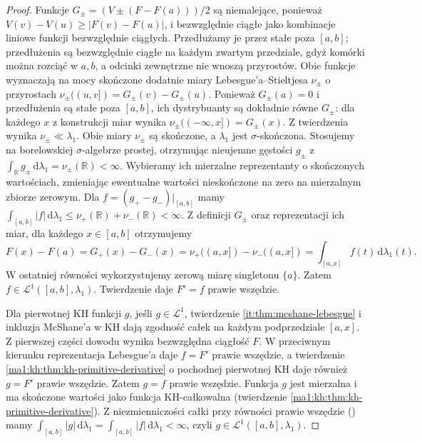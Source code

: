 \begin{proof}
Funkcje $G_\pm=(V\pm(F-F(a)))/2$ są niemalejące, ponieważ $V(v)-V(u)\ge|F(v)-F(u)|$, i bezwzględnie ciągłe jako kombinacje liniowe funkcji bezwzględnie ciągłych. Przedłużamy je przez stałe poza $[a,b]$; przedłużenia są bezwzględnie ciągłe na każdym zwartym przedziale, gdyż komórki można rozciąć w $a,b$, a odcinki zewnętrzne nie wnoszą przyrostów. Obie funkcje wyznaczają na mocy  skończone dodatnie miary Lebesgue'a--Stieltjesa $\nu_\pm$ o przyrostach $\nu_\pm((u,v])=G_\pm(v)-G_\pm(u)$. Ponieważ $G_\pm(a)=0$ i przedłużenia są stałe
poza $[a,b]$, ich dystrybuanty są dokładnie równe
$G_\pm$: dla każdego $x$ z konstrukcji miar wynika
$\nu_\pm((-\infty,x])=G_\pm(x)$.
Z twierdzenia  wynika
$\nu_\pm\ll\lambda_1$. Obie miary $\nu_\pm$ są skończone, a $\lambda_1$
jest $\sigma$-skończona. Stosujemy
na borelowskiej $\sigma$-algebrze prostej, otrzymując
nieujemne gęstości $g_\pm$ z
$\int_{\mathbb R}g_\pm\,\mathrm d\lambda_1=\nu_\pm(\mathbb R)<\infty$.
Wybieramy ich mierzalne reprezentanty o skończonych wartościach,
zmieniając ewentualne wartości nieskończone na zero
na mierzalnym zbiorze zerowym.
Dla $f=(g_+-g_-)|_{[a,b]}$ mamy
$\int_{[a,b]}|f|\,\mathrm d\lambda_1
\le\nu_+(\mathbb R)+\nu_-(\mathbb R)<\infty$.
Z definicji $G_\pm$ oraz reprezentacji ich miar,
dla każdego $x\in[a,b]$ otrzymujemy
\[
 F(x)-F(a)=G_+(x)-G_-(x)
 =\nu_+((a,x])-\nu_-((a,x])
 =\int_{[a,x]}f(t)\,\mathrm d\lambda_1(t).
\]
W ostatniej równości wykorzystujemy zerową miarę
singletonu $\{a\}$. Zatem $f\in\mathcal L^1([a,b],\lambda_1)$. Twierdzenie  daje $F'=f$ prawie wszędzie.

Dla pierwotnej KH funkcji $g$, jeśli $g\in\mathcal L^1$, twierdzenie \ref{it:thm:mcshane-lebesgue} i inkluzja McShane'a w KH dają zgodność całek na każdym podprzedziale $[a,x]$. Z pierwszej części dowodu wynika bezwzględna ciągłość $F$. W przeciwnym kierunku reprezentacja Lebesgue'a daje $f=F'$ prawie wszędzie, a twierdzenie \ref{ma1:kh:thm:kh-primitive-derivative} o pochodnej pierwotnej KH daje również $g=F'$ prawie wszędzie. Zatem $g=f$ prawie wszędzie. Funkcja $g$ jest mierzalna i ma skończone wartości jako funkcja KH-całkowalna (twierdzenie \ref{ma1:kh:thm:kh-primitive-derivative}). Z niezmienniczości całki przy równości prawie wszędzie () mamy $\int_{[a,b]}|g|\,\mathrm d\lambda_1=\int_{[a,b]}|f|\,\mathrm d\lambda_1<\infty$, czyli $g\in\mathcal L^1([a,b],\lambda_1)$.
\end{proof}
